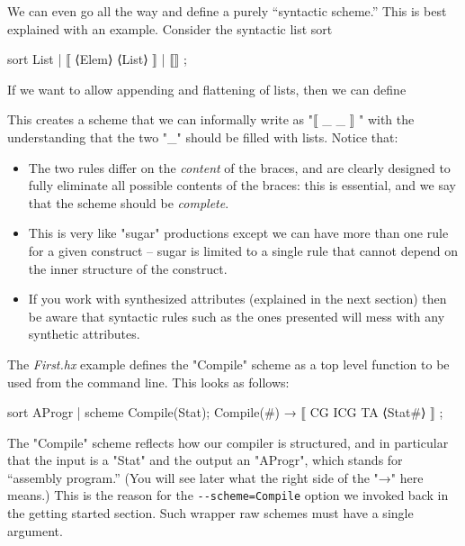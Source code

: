 \documentclass[11pt]{article} %
\begin{document}
\begin{example}\label{ex:append}
  We can even go all the way and define a purely ``syntactic scheme.''  This is best explained with
  an example. Consider the syntactic list sort
\begin{hacs}
sort List | ⟦ ⟨Elem⟩ ⟨List⟩ ⟧ | ⟦⟧ ;
\end{hacs}
  If we want to allow appending and flattening of lists, then we can define
  This creates a scheme that we can informally write as "⟦ { _ } _ ⟧ " with the understanding that
  the two "_" should be filled with lists. Notice that:
  \begin{itemize}

  \item The two rules differ on the \emph{content} of the braces, and are clearly designed to fully
    eliminate all possible contents of the braces: this is essential, and we say that the scheme
    should be \emph{complete}.

  \item This is very like "sugar" productions except we can have more than one rule for a given
    construct -- sugar is limited to a single rule that cannot depend on the inner structure of the
    construct.

  \item If you work with synthesized attributes (explained in the next section) then be aware that
    syntactic rules such as the ones presented will mess with any synthetic attributes.

  \end{itemize}
\end{example}

\begin{example}
  The \emph{First.hx} example defines the "Compile" scheme as a top level function to be used from
  the command line. This looks as follows:
\begin{hacs}[xleftmargin=\parindent,numbers=right]
sort AProgr | scheme Compile(Stat);
Compile(#) → ⟦ CG ICG TA ⟨Stat#⟩ ⟧ ;
\end{hacs}
  The "Compile" scheme reflects how our compiler is structured, and in particular that the input is
  a "Stat" and the output an "AProgr", which stands for ``assembly program.''
  (You will see later what the right side of the "→" here means.)  This is the reason for the
  \verb|--scheme=Compile| option we invoked back in the getting started section.  Such wrapper raw
  schemes must have a single argument.
\end{example}
\end{document}
